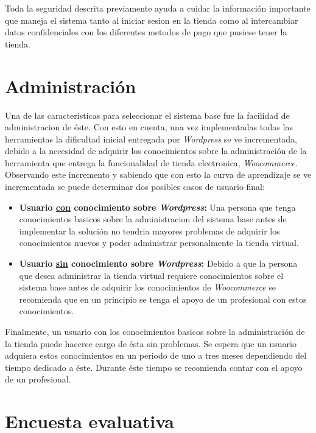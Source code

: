 Toda la seguridad descrita previamente ayuda a cuidar la información importante que maneja el sistema 
tanto al iniciar sesion en la tienda como al intercambiar datos confidenciales con los diferentes 
metodos de pago que pusiese tener la tienda.

\section{Administración}

Una de las caracteristicas para seleccionar el sistema base fue la facilidad de 
administracion de éste. Con esto en cuenta, una vez implementadas todas las herramientas la
dificultad inicial entregada por \emph{Wordpress} se ve incrementada, debido a la necesidad de adquirir los 
conocimientos sobre la administración de la herramienta que entrega la funcionalidad de tienda electronica,
 \emph{Woocommerce}. Observando este incremento y sabiendo que con esto la curva de aprendizaje se
ve incrementada se puede determinar dos posibles casos de usuario final:

\begin{itemize}

\item {\bf Usuario \underline{con} conocimiento sobre \emph{Wordpress}:} Una persona que tenga conocimientos basicos 
sobre la administracion del sistema base antes de implementar la solución no tendria mayores problemas de
adquirir los conocimientos nuevos y poder administrar personalmente la tienda virtual.

\item {\bf Usuario \underline{sin} conocimiento sobre \emph{Wordpress}:} Debido a que la persona que desea administrar
la tienda virtual requiere conocimientos sobre el sistema base antes de adquirir los conocimientos de 
\emph{Woocommerce} se recomienda que en un principio se tenga el apoyo de un profesional con estos conocimientos.

\end{itemize}  

Finalmente, un usuario con los conocimientos basicos sobre la administración de la tienda puede hacerce cargo de ésta
sin problemas. Se espera que un usuario adquiera estos conocimientos en un periodo de uno a tres meses dependiendo
del tiempo dedicado a éste. Durante éste tiempo se recomienda contar con el apoyo de un profesional. 

\section{Encuesta evaluativa}

